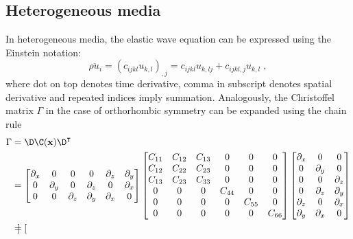 \subsection{Heterogeneous media}
In heterogeneous media, the elastic wave equation can be expressed using the Einstein notation:
\begin{equation}
    \rho \ddot{u}_i = (c_{ijkl} u_{k,l})_{,j} = c_{ijkl} u_{k,lj} + c_{ijkl,j} u_{k,l} \;,
\end{equation}
where dot on top denotes time derivative, comma in subscript denotes spatial derivative and repeated indices imply summation. Analogously, the Christoffel matrix $\Gamma$ in the case of orthorhombic symmetry can be expanded using the chain rule
\begin{eqnarray}
    \Gamma 
    &= \D \C(\mathbf{x}) \D^\intercal \\ \nonumber
    &= 
    \begin{bmatrix}
        \partial_x & 0 & 0 & 0 & \partial_z & \partial_y \\
        0 & \partial_y & 0 & \partial_z & 0 & \partial_x \\
        0 & 0 & \partial_z & \partial_y & \partial_x & 0
    \end{bmatrix}
    \begin{bmatrix}
        C_{11} & C_{12} & C_{13} & 0 & 0 & 0                \\
        C_{12} & C_{22} & C_{23} & 0 & 0 & 0                \\
        C_{13} & C_{23} & C_{33} & 0 & 0 & 0                \\
        0      & 0      & 0      & C_{44} & 0      & 0      \\
        0      & 0      & 0      & 0      & C_{55} & 0      \\
        0      & 0      & 0      & 0      & 0      & C_{66}
    \end{bmatrix}
    \begin{bmatrix}
        \partial_x & 0 & 0\\
        0 & \partial_y & 0\\
        0 & 0 & \partial_z\\
        0 & \partial_z & \partial_y\\
        \partial_z & 0 & \partial_x\\
        \partial_y & \partial_x & 0
    \end{bmatrix} \\ \nonumber
    &=
    \begin{bmatrix}

\end{bmatrix}
\end{eqnarray}
